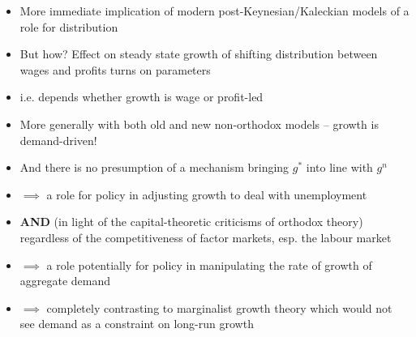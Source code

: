 \documentclass[a4paper,twoside]{article}
\numberwithin{equation}{section}
\numberwithin{figure}{section}
\begin{document}
\begin{itemize}
	\item More immediate implication of modern post-Keynesian/Kaleckian models of a role for distribution
	\item But how? Effect on steady state growth of shifting distribution between wages and profits turns on parameters 
	\item i.e. depends whether growth is wage or profit-led
	\item More generally with both old and new non-orthodox models -- growth is demand-driven!
	\item And there is no presumption of a mechanism bringing \( g^\ast \)  into line with \( g^n \) 
	\item \( \implies \) a role for policy in adjusting growth to deal with unemployment
	\item \textbf{AND} (in light of the capital-theoretic criticisms of orthodox theory) regardless of the competitiveness of factor markets, esp. the labour market
	\item \( \implies \) a role potentially for policy in manipulating the rate of growth of aggregate demand
	\item \( \implies \) completely contrasting to marginalist growth theory which would not see demand as a constraint on long-run growth
\end{itemize}
\end{document}
